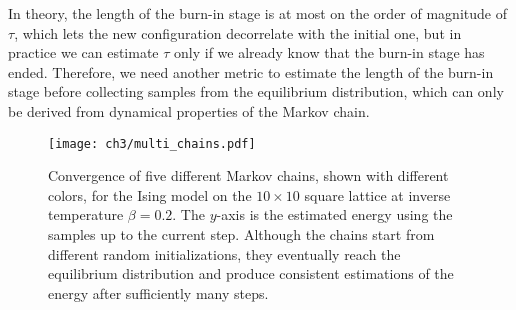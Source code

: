 In theory, the length of the burn-in stage is at most on the order of magnitude of $\tau$, which lets the new configuration decorrelate with the initial one, but in practice we can estimate $\tau$ only if we already know that the burn-in stage has ended. Therefore, we need another metric to estimate the length of the burn-in stage before collecting samples from the equilibrium distribution, which can only be derived from dynamical properties of the Markov chain.

\begin{figure}[htb]
\centering
\texttt{[image: ch3/multi\_chains.pdf]}
\caption[Convergence of multiple Markov chains]{
Convergence of five different Markov chains, shown with different colors, for the Ising model on the $10 \times 10$ square lattice at inverse temperature $\beta = 0.2$.
The $y$-axis is the estimated energy using the samples up to the current step.
Although the chains start from different random initializations, they eventually reach the equilibrium distribution and produce consistent estimations of the energy after sufficiently many steps.
}
\label{fig:multi-chains}
\end{figure}


